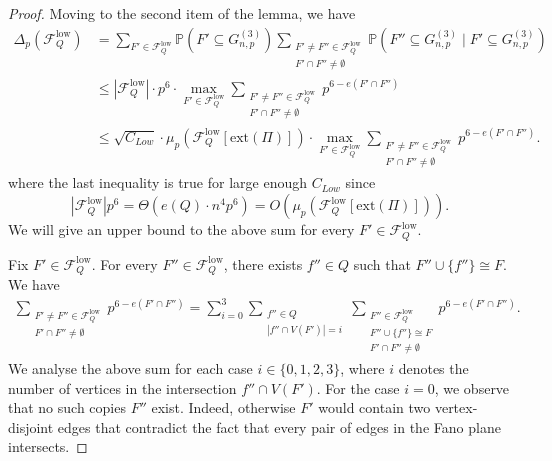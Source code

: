 \documentclass[10pt,a4paper]{amsart}
\newcommand{\Gnp}{G_{n, p}^{(3)}}
\renewcommand{\Pr}{\mathbb{P}}
\newcommand{\cF}{\mathcal{F}}
\newcommand{\cFQL}{\cF_Q^{\mathrm{low}}}
\newcommand{\ext}{\mathrm{ext}}
\renewcommand{\le}{\leqslant}
\begin{document}
\begin{proof}
    Moving to the second item of the lemma, we have
    \begin{align*}
        \Delta_p\left(\cFQL\right) &= \sum_{F' \in \cFQL} \Pr\left(F' \subseteq \Gnp\right) \sum_{\substack{F' \neq F'' \in \cFQL \\ F' \cap F'' \neq \emptyset}} \Pr\left(F'' \subseteq \Gnp \mid F' \subseteq \Gnp\right) \\
        &\le \left|\cFQL\right| \cdot p^{6} \cdot \max_{F' \in \cFQL} \sum_{\substack{F' \neq F'' \in \cFQL \\ F' \cap F'' \neq \emptyset}} p^{6 - e(F' \cap F'')}\\
        &\le \sqrt{C_{Low}} \cdot \mu_p\left(\cFQL[\ext(\Pi)]\right) \cdot \max_{F' \in \cFQL} \sum_{\substack{F' \neq F'' \in \cFQL \\ F' \cap F'' \neq \emptyset}} p^{6 - e(F' \cap F'')}.
    \end{align*}
    where the last inequality is true for large enough $C_{Low}$ since 
    \[
        \left|\cFQL\right| p^{6} = \Theta\left(e(Q) \cdot n^{4} p^{6}\right) = O\left(\mu_p\left(\cFQL[\ext(\Pi)]\right)\right).
    \]
    We will give an upper bound to the above sum for every $F' \in \cFQL$.    

    Fix $F' \in \cFQL$. For every $F'' \in \cFQL$, there exists $f'' \in Q$ such that $F'' \cup \{f''\} \cong F$. We have
    \begin{align}\label{align:sum-of-low-delta}
        \sum_{\substack{F' \neq F'' \in \cFQL \\ F' \cap F'' \neq \emptyset}} p^{6 - e(F' \cap F'')} = 
        \sum_{i=0}^{3} \sum_{\substack{f'' \in Q \\ |f'' \cap V(F')| = i}} \sum_{\substack{F'' \in \cFQL \\ F'' \cup \{f''\} \cong F \\ F' \cap F'' \neq \emptyset}} p^{6 - e(F' \cap F'')}.
    \end{align}
    We analyse the above sum for each case $i \in \{0, 1, 2, 3\}$, where $i$ denotes the number of vertices in the intersection $f'' \cap V(F')$. For the case $i=0$, we observe that no such copies $F''$ exist. Indeed, otherwise $F'$ would contain two vertex-disjoint edges that contradict the fact that every pair of edges in the Fano plane intersects.


\end{proof}
\end{document}
